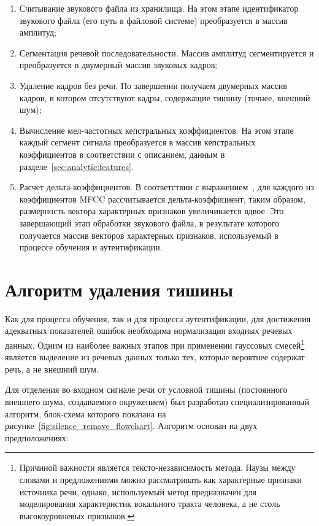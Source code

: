 \begin{enumerate}
\item Считывание звукового файла из хранилища. На этом этапе идентификатор звукового файла (его путь в файловой системе) преобразуется в массив амплитуд;
\item Сегментация речевой последовательности. Массив амплитуд сегментируется и преобразуется в двумерный массив звуковых кадров;
\item Удаление кадров без речи. По завершении получаем двумерных массив кадров, в котором отсутствуют кадры, содержащие тишину (точнее, внешний шум);
\item Вычисление мел-частотных кепстральных коэффициентов. На этом этапе каждый сегмент сигнала преобразуется в массив кепстральных коэффициентов в соответствии с описанием, данным в разделе~\ref{sec:analytic:features}.
\item Расчет дельта-коэффициентов. В соответствии с выражением~, для каждого из коэффициентов MFCC рассчитывается дельта-коэффициент, таким образом, размерность вектора характерных признаков увеличивается вдвое. Это завершающий этап обработки звукового файла, в результате которого получается массив векторов характерных признаков, используемый в процессе обучения и аутентификации.
\end{enumerate}

\section{Алгоритм удаления тишины}

Как для процесса обучения, так и для процесса аутентификации, для достижения адекватных показателей ошибок необходима нормализация входных речевых данных. Одним из наиболее важных этапов при применении гауссовых смесей\footnote{Причиной важности является тексто-независимость метода. Паузы между словами и предложениями можно рассматривать как характерные признаки источника речи, однако, используемый метод предназначен для моделирования характеристик вокального тракта человека, а не столь высокоуровневых признаков.} является выделение из речевых данных только тех, которые вероятнее содержат речь, а не внешний шум.

Для отделения во входном сигнале речи от условной тишины (постоянного внешнего шума, создаваемого окружением) был разработан специализированный алгоритм, блок-схема которого показана на рисунке~\ref{fig:silence_remove_flowchart}. Алгоритм основан на двух предположениях:

